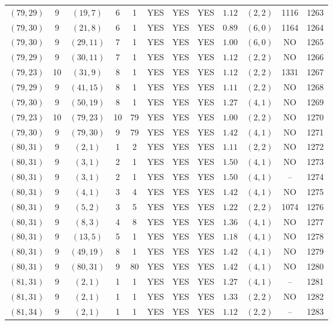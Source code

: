 \begin{longtable}{|c|c|c|c|c|c|c|c|c|c|c|c|}
$(79,29)$ & 9 & $(19,7)$ & 6 & 1 & YES & YES & YES & $1.12$ & $(2,2)$ & 1116 & 1263\\
$(79,30)$ & 9 & $(21,8)$ & 6 & 1 & YES & YES & YES & $0.89$ & $(6,0)$ & 1164 & 1264\\
$(79,30)$ & 9 & $(29,11)$ & 7 & 1 & YES & YES & YES & $1.00$ & $(6,0)$ & NO & 1265\\
$(79,29)$ & 9 & $(30,11)$ & 7 & 1 & YES & YES & YES & $1.12$ & $(2,2)$ & NO & 1266\\
$(79,23)$ & 10 & $(31,9)$ & 8 & 1 & YES & YES & YES & $1.12$ & $(2,2)$ & 1331 & 1267\\
$(79,29)$ & 9 & $(41,15)$ & 8 & 1 & YES & YES & YES & $1.11$ & $(2,2)$ & NO & 1268\\
$(79,30)$ & 9 & $(50,19)$ & 8 & 1 & YES & YES & YES & $1.27$ & $(4,1)$ & NO & 1269\\
$(79,23)$ & 10 & $(79,23)$ & 10 & 79 & YES & YES & YES & $1.00$ & $(2,2)$ & NO & 1270\\
$(79,30)$ & 9 & $(79,30)$ & 9 & 79 & YES & YES & YES & $1.42$ & $(4,1)$ & NO & 1271\\
$(80,31)$ & 9 & $(2,1)$ & 1 & 2 & YES & YES & YES & $1.11$ & $(2,2)$ & NO & 1272\\
$(80,31)$ & 9 & $(3,1)$ & 2 & 1 & YES & YES & YES & $1.50$ & $(4,1)$ & NO & 1273\\
$(80,31)$ & 9 & $(3,1)$ & 2 & 1 & YES & YES & YES & $1.50$ & $(4,1)$ & -- & 1274\\
$(80,31)$ & 9 & $(4,1)$ & 3 & 4 & YES & YES & YES & $1.42$ & $(4,1)$ & NO & 1275\\
$(80,31)$ & 9 & $(5,2)$ & 3 & 5 & YES & YES & YES & $1.22$ & $(2,2)$ & 1074 & 1276\\
$(80,31)$ & 9 & $(8,3)$ & 4 & 8 & YES & YES & YES & $1.36$ & $(4,1)$ & NO & 1277\\
$(80,31)$ & 9 & $(13,5)$ & 5 & 1 & YES & YES & YES & $1.18$ & $(4,1)$ & NO & 1278\\
$(80,31)$ & 9 & $(49,19)$ & 8 & 1 & YES & YES & YES & $1.42$ & $(4,1)$ & NO & 1279\\
$(80,31)$ & 9 & $(80,31)$ & 9 & 80 & YES & YES & YES & $1.42$ & $(4,1)$ & NO & 1280\\
$(81,31)$ & 9 & $(2,1)$ & 1 & 1 & YES & YES & YES & $1.27$ & $(4,1)$ & -- & 1281\\
$(81,31)$ & 9 & $(2,1)$ & 1 & 1 & YES & YES & YES & $1.33$ & $(2,2)$ & NO & 1282\\
$(81,34)$ & 9 & $(2,1)$ & 1 & 1 & YES & YES & YES & $1.12$ & $(2,2)$ & -- & 1283\\

\end{longtable}
